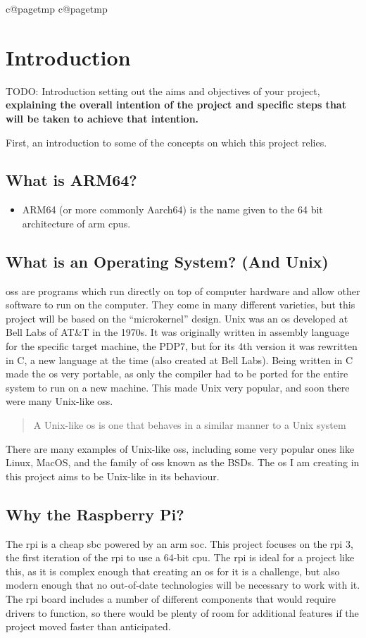 \documentclass{article}
\makeatletter
\newcommand{\mypagenumbering}[1]{%
    \ifcsname c@pagetmp\endcsname
    \else
        \newcounter{pagetmp}
    \fi
    \setcounter{pagetmp}{\value{page}}
    \pagenumbering{#1}
    \setcounter{page}{\value{pagetmp}}
}
\makeatother
\begin{document}
{\mypagenumbering{roman}\hypersetup{hidelinks} \tableofcontents}
\clearpage
\mypagenumbering{arabic}

\section{Introduction}
TODO: Introduction setting out the aims and objectives of your project,
\textbf{explaining the overall intention of the project and specific steps that
will be taken to achieve that intention.}


First, an introduction to some of the concepts on which this project relies.

\subsection{What is ARM64?}
\begin{itemize}
    \item ARM64 (or more commonly Aarch64) is the name given to the 64 bit
        architecture of \gls{arm} \glspl{cpu}.
\end{itemize}
\subsection{What is an Operating System? (And Unix)}
\glspl{os} are programs which run directly on top of computer hardware and
allow other software to run on the computer. They come in many different
varieties, but this project will be based on the ``microkernel'' design. Unix
was an \gls{os} developed at Bell Labs of AT\&T in the 1970s. It was originally
written in assembly language for the specific target machine, the PDP7, but for
its 4th version it was rewritten in C, a new language at the time (also created
at Bell Labs). Being written in C made the \gls{os} very portable, as only the
compiler had to be ported for the entire system to run on a new machine. This
made Unix very popular, and soon there were many Unix-like \glspl{os}.
\blockquote[\cite{unix-like}]{A Unix-like \gls{os} is one that behaves in a
similar manner to a Unix system}.
There are many examples of Unix-like \glspl{os}, including some very popular
ones like Linux, MacOS, and the family of \glspl{os} known as the BSDs. The
\gls{os} I am creating in this project aims to be Unix-like in its behaviour.

\subsection{Why the Raspberry Pi?}
The \gls{rpi} is a cheap \gls{sbc} powered by an \gls{arm} \gls{soc}. This
project focuses on the \gls{rpi} 3, the first iteration of the \gls{rpi} to use
a 64-bit \gls{cpu}. The \gls{rpi} is ideal for a project like this, as it is
complex enough that creating an \gls{os} for it is a challenge, but also modern
enough that no out-of-date technologies will be necessary to work with it. The
\gls{rpi} board includes a number of different components that would require
drivers to function, so there would be plenty of room for additional features
if the project moved faster than anticipated.
\end{document}
